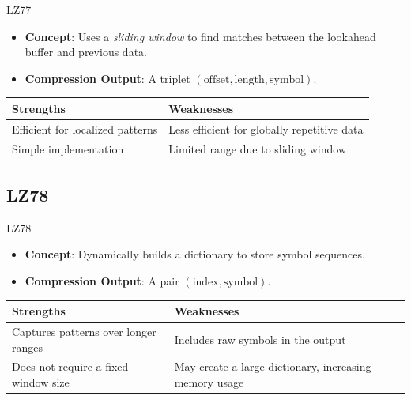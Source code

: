 \documentclass[10pt,handout,english]{beamer}
\begin{document}
\begin{frame}{LZ77}
    \begin{itemize}
        \item \textbf{Concept}: Uses a \textit{sliding window} to find matches between the lookahead buffer and previous data.
        \item \textbf{Compression Output}: A triplet \((\text{offset}, \text{length}, \text{symbol})\).
    \end{itemize}
    \begin{table}[h!]
        \centering
        \begin{tabular}{|p{3.5cm}|p{5cm}|}
        \hline
        \textbf{Strengths} & \textbf{Weaknesses}    \\ \hline
        Efficient for localized patterns & Less efficient for globally repetitive data \\ \hline
        Simple implementation & Limited range due to sliding window \\ \hline
        \end{tabular}
    \end{table}
    
\end{frame}

\subsection{LZ78}

\begin{frame}{LZ78}
    \begin{itemize}
        \item \textbf{Concept}: Dynamically builds a dictionary to store symbol sequences.
        \item \textbf{Compression Output}: A pair \((\text{index}, \text{symbol})\).
    \end{itemize}
    
    \begin{table}[h!]
        \centering
        \begin{tabular}{|p{5cm}|p{5cm}|}
        \hline
        \textbf{Strengths} & \textbf{Weaknesses}    \\ \hline
        Captures patterns over longer ranges & Includes raw symbols in the output \\ \hline
        Does not require a fixed window size & May create a large dictionary, increasing memory usage \\ \hline
        \end{tabular}
    \end{table}
\end{frame}
\end{document}

